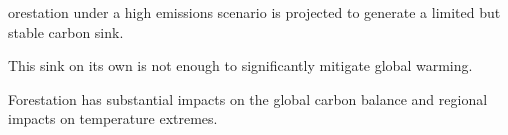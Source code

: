 \documentclass[draft]{agujournal2019}
\begin{document}








\begin{keypoints}
\item {}orestation under a high emissions scenario is projected to generate a limited but stable carbon sink.
\item This sink on its own is not enough to significantly mitigate global warming.
\item Forestation has substantial impacts on the global carbon balance and  regional impacts on temperature extremes.
\end{keypoints}

%
%

%
%
\end{document}
